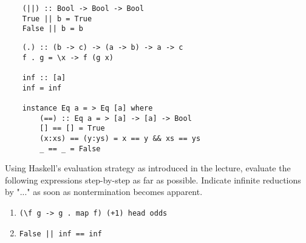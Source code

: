 \documentclass{article}
\def\code#1{\texttt{#1}}
\begin{document}
\begin{enumerate}
\begin{multicols}{2}
\begin{verbatim}
    (||) :: Bool -> Bool -> Bool
    True || b = True
    False || b = b
        \end{verbatim}
        \begin{verbatim}
    (.) :: (b -> c) -> (a -> b) -> a -> c
    f . g = \x -> f (g x)

    inf :: [a]
    inf = inf

    instance Eq a = > Eq [a] where
        (==) :: Eq a = > [a] -> [a] -> Bool
        [] == [] = True
        (x:xs) == (y:ys) = x == y && xs == ys
        _ == _ = False
        \end{verbatim}
        \end{multicols}
        Using Haskell's evaluation strategy as introduced in the lecture, evaluate the following expressions step-by-step as far as possible. Indicate infinite reductions by "..." as soon as nontermination becomes apparent.
        \begin{enumerate}
            \item \code{(\textbackslash f g -> g . map f) (+1) head odds}
            \item \code{False || inf == inf}
        \end{enumerate}
\end{enumerate}
\end{document}
